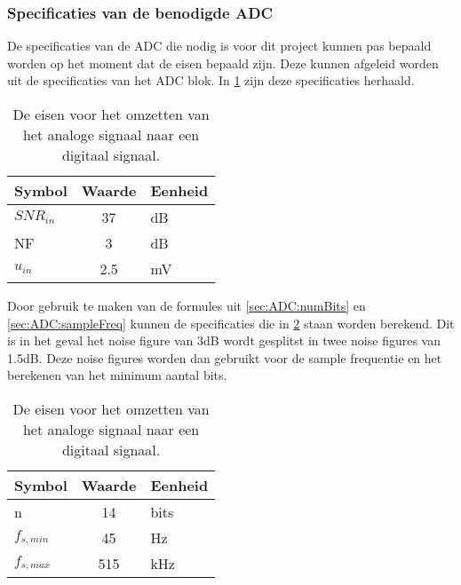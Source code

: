 \subsubsection{Specificaties van de benodigde ADC}
De specificaties van de ADC die nodig is voor dit project kunnen pas bepaald worden op het moment dat de eisen bepaald zijn. Deze kunnen afgeleid worden uit de specificaties van het ADC blok. In \cref{tab:systemSpecADC} zijn deze specificaties herhaald.
\begin{table}[ht]
    \centering
    \begin{tabular}{l|c|l}
        Symbol      & Waarde & Eenheid\\\hline
        $SNR_{in}$  & 37        & dB\\
        NF          & 3         & dB\\
        $u_{in}$    & 2.5       & mV\\
    \end{tabular}
    \caption{De eisen voor het omzetten van het analoge signaal naar een digitaal signaal.}
    \label{tab:systemSpecADC}
\end{table}
Door gebruik te maken van de formules uit \cref{sec:ADC:numBits} en \cref{sec:ADC:sampleFreq} kunnen de specificaties die in \cref{tab:specADC} staan worden berekend. Dit is in het geval het noise figure van 3dB wordt gesplitst in twee noise figures van 1.5dB. Deze noise figures worden dan gebruikt voor de sample frequentie en het berekenen van het minimum aantal bits.
\begin{table}[ht]
    \centering
    \begin{tabular}{l|c|l}
        Symbol      & Waarde    & Eenheid\\\hline
        n           & 14        & bits\\
        $f_{s,min}$ & 45        & Hz\\
        $f_{s,max}$ & 515       & kHz\\
    \end{tabular}
    \caption{De eisen voor het omzetten van het analoge signaal naar een digitaal signaal.}
    \label{tab:specADC}
\end{table}

